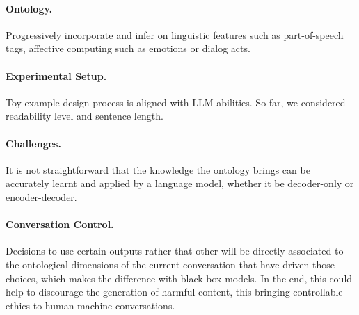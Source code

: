 \documentclass[a0paper,portrait]{baposter}
\begin{document}
\begin{poster}
{\paragraph*{Ontology.} Progressively incorporate and infer on linguistic features such as part-of-speech tags, affective computing such as emotions or dialog acts.\\
\paragraph*{Experimental Setup.} Toy example design process is aligned with LLM abilities. So far, we considered readability level and sentence length.\\
\paragraph*{Challenges.} It is not straightforward that the knowledge the ontology brings can be accurately learnt and applied by a language model, whether it be decoder-only or encoder-decoder.\\
\paragraph*{Conversation Control.} Decisions to use certain outputs rather that other will be directly associated to the ontological dimensions of the current conversation that have driven those choices, which makes the difference with black-box models. In the end, this could help to discourage the generation of harmful content, this bringing controllable ethics to human-machine conversations.\\

}





\end{poster}
\end{document}

